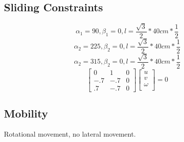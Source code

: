 \subsection{Sliding Constraints}
$$
\alpha_1 =  90, 
\beta_1 = 0,
l = \dfrac{\sqrt{3}}{2} * 40cm * \dfrac{1}{2}
$$
$$
\alpha_2 =  225, 
\beta_2 = 0,
l = \dfrac{\sqrt{3}}{2} * 40cm * \dfrac{1}{2}
$$
$$
\alpha_2 =  315, 
\beta_2 = 0,
l = \dfrac{\sqrt{3}}{2} * 40cm * \dfrac{1}{2}
$$
$$
\begin{bmatrix} 
0 & 1 & 0\\
-.7 & -.7 & 0\\
.7 & -.7 & 0
\end{bmatrix} 
\begin{bmatrix} 
u \\
v \\
\omega \\
\end{bmatrix} 
= 
0
$$

\subsection{Mobility}
Rotational movement, no lateral movement.